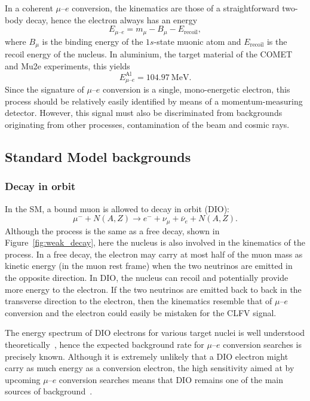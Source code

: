In a coherent $\mu$--$e$ conversion, the kinematics are those of a
straightforward two-body decay, hence the electron always has an energy
\begin{equation*}\label{eq:mu_e_conv_energy}
E_{\mu\text{--}e} = m_\mu - B_\mu - E_\mathrm{recoil},
\end{equation*}
where $B_\mu$ is the binding energy of the $1s$-state muonic atom and
$E_\mathrm{recoil}$ is the recoil energy of the nucleus. In aluminium, the
target material of the COMET and Mu2e experiments, this yields
$$
    E^\mathrm{Al}_{\mu\text{--}e} = \SI{104.97}{\MeV}.
$$
Since the signature of $\mu$--$e$ conversion is a single, mono-energetic
electron, this process should be relatively easily identified by means of a
momentum-measuring detector. However, this signal must also be discriminated
from backgrounds originating from other processes, contamination of the beam and
cosmic rays.

\subsection{Standard Model backgrounds}\label{sec:sm_backgrounds}
\subsubsection{Decay in orbit}
In the SM, a bound muon is allowed to decay in orbit (DIO):
\begin{equation*}\label{eq:dio}
    \mu^- + N(A, Z) \rightarrow e^- + \nu_\mu + \overline{\nu}_e + N(A, Z).
\end{equation*}
Although the process is the same as a free decay, shown in
Figure~\ref{fig:weak_decay}, here the nucleus is also involved in the kinematics
of the process. In a free decay, the electron may carry at most half of the muon
mass as kinetic energy (in the muon rest frame) when the two neutrinos are
emitted in the opposite direction. In DIO, the nucleus can recoil and
potentially provide more energy to the electron. If the two neutrinos are
emitted back to back in the transverse direction to the electron, then the
kinematics resemble that of $\mu$--$e$ conversion and the electron could easily
be mistaken for the CLFV signal. 


The energy spectrum of DIO electrons for various target nuclei is well
understood theoretically~\cite{czarnecki}, hence the expected background rate
for $\mu$--$e$ conversion searches is precisely known. Although it is extremely
unlikely that a DIO electron might carry as much energy as a conversion
electron, the high sensitivity aimed at by upcoming $\mu$--$e$ conversion
searches means that DIO remains one of the main sources of
background~\cite{the_comet_collaboration_comet_2020}.



